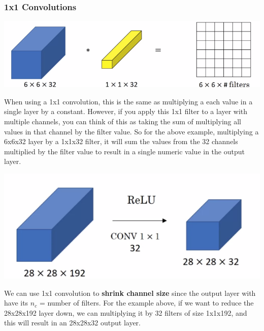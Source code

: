 \documentclass[11pt, a4paper]{article}
\begin{document}
\begin{spacing}{1.1}
	\subsubsection{1x1 Convolutions}
	\begin{center}	\includegraphics[scale=.57]{1x1_ex}	\end{center}
	When using a 1x1 convolution, this is the same as multiplying a each value in a single layer by a constant. However, if you apply this 1x1 filter to a layer with multiple channels, you can think of this as taking the sum of multiplying all values in that channel by the filter value. So for the above example, multiplying a 6x6x32 layer by a 1x1x32 filter, it will sum the values from the 32 channels multiplied by the filter value to result in a single numeric value in the output layer. 
	\begin{center} \includegraphics[scale=.57]{1x1}	\end{center}
	We can use 1x1 convolution to \textbf{shrink channel size} since the output layer with have its $n_c$ = number of filters. For the example above, if we want to reduce the 28x28x192 layer down, we can multiplying it by 32 filters of size 1x1x192, and this will result in an 28x28x32 output layer.
	

\end{spacing}
\end{document}

